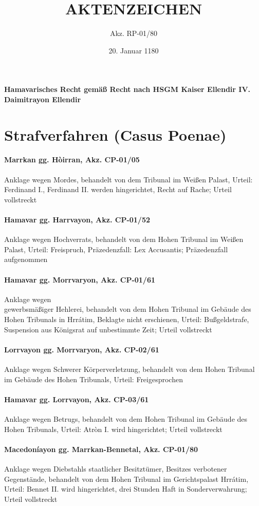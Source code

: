 \documentclass{article}
\title{AKTENZEICHEN}
\author{Akz. RP-01/80}
\date{20. Januar 1180}
\begin{document}
\maketitle
\vspace*{\fill}
\paragraph{Hamavarisches Recht gemäß Recht nach HSGM Kaiser Ellendir IV. Daimitrayon Ellendir}
\newpage
\section{Strafverfahren (Casus Poenae)}
\paragraph{Marrkan gg. Hòirran, Akz. CP-01/05}
Anklage wegen Mordes,
behandelt von dem Tribunal im Weißen Palast, Urteil: Ferdinand I., Ferdinand II. werden hingerichtet, Recht auf Rache; Urteil vollstreckt
\paragraph{Hamavar gg. Harrvayon, Akz. CP-01/52}
Anklage wegen Hochverrats, behandelt von dem Hohen Tribunal im Weißen Palast, Urteil: Freispruch, Präzedenzfall: Lex Accusantis; Präzedenzfall aufgenommen
\paragraph{Hamavar gg. Morrvaryon, Akz. CP-01/61}
Anklage wegen\\gewerbsmäßiger Hehlerei, behandelt von dem Hohen Tribunal im Gebäude des Hohen Tribunals in Hrrátim, Beklagte nicht erschienen,
Urteil: Bußgeldstrafe, Suspension aus Königsrat auf unbestimmte Zeit; Urteil vollstreckt
\paragraph{Lorrvayon gg. Morrvaryon, Akz. CP-02/61}
Anklage wegen Schwerer Körperverletzung, behandelt von dem Hohen Tribunal im Gebäude des Hohen Tribunals, Urteil: Freigesprochen
\paragraph{Hamavar gg. Lorrvayon, Akz. CP-03/61}
Anklage wegen Betrugs, behandelt von dem Hohen Tribunal im Gebäude des Hohen Tribunals, Urteil: Atròn I. wird hingerichtet; Urteil vollstreckt
\paragraph{Macedoníayon gg. Marrkan-Bennetal, Akz. CP-01/80}
Anklage wegen Diebstahls staatlicher Besitztümer, Besitzes verbotener Gegenstände, behandelt von dem Hohen Tribunal im Gerichtspalast Hrrátim, Urteil: Bennet II. wird hingerichtet, drei Stunden Haft in Sonderverwahrung; Urteil vollstreckt
\end{document}
